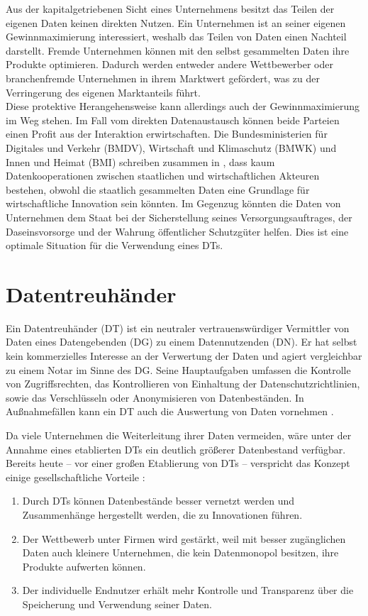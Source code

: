 \documentclass[
	fontsize=11pt,
	headings=small,
	parskip=half,           %
	bibliography=totoc,
	numbers=noenddot,       %
	open=any,               %
]{scrreprt}
\begin{document}
Aus der kapitalgetriebenen Sicht eines Unternehmens besitzt das Teilen der eigenen Daten keinen direkten Nutzen. Ein Unternehmen ist an seiner eigenen Gewinnmaximierung interessiert, weshalb das Teilen von Daten einen Nachteil darstellt. Fremde Unternehmen können mit den selbst gesammelten Daten ihre Produkte optimieren. Dadurch werden entweder andere Wettbewerber oder branchenfremde Unternehmen in ihrem Marktwert gefördert, was zu der Verringerung des eigenen Marktanteils führt. \\
Diese protektive Herangehensweise kann allerdings auch der Gewinnmaximierung im Weg stehen. Im Fall vom direkten Datenaustausch können beide Parteien einen Profit aus der Interaktion erwirtschaften. Die Bundesministerien für Digitales und Verkehr (BMDV), Wirtschaft und Klimaschutz (BMWK) und Innen und Heimat (BMI) schreiben zusammen in \cite{dt-bundesregierung2021datenstrategie}, dass kaum Datenkooperationen zwischen staatlichen und wirtschaftlichen Akteuren bestehen, obwohl die staatlich gesammelten Daten eine Grundlage für wirtschaftliche Innovation sein könnten. Im Gegenzug könnten die Daten von Unternehmen dem Staat bei der Sicherstellung seines Versorgungsauftrages, der Daseinsvorsorge und der Wahrung öffentlicher Schutzgüter helfen. Dies ist eine optimale Situation für die Verwendung eines DTs.
\section{Datentreuhänder}
\label{sec:dt}
Ein Datentreuhänder (DT) ist ein neutraler vertrauenswürdiger Vermittler von Daten eines Datengebenden (DG) zu einem Datennutzenden (DN). Er hat selbst kein kommerzielles Interesse an der Verwertung der Daten und agiert vergleichbar zu einem Notar im Sinne des DG. Seine Hauptaufgaben umfassen die Kontrolle von Zugriffsrechten, das Kontrollieren von Einhaltung der Datenschutzrichtlinien, sowie das Verschlüsseln oder Anonymisieren von Datenbeständen. In Außnahmefällen kann ein DT auch die Auswertung von Daten vornehmen \cite{dt-bundesregierung2021datenstrategie,dt-richter2020ddvtalk}.

Da viele Unternehmen die Weiterleitung ihrer Daten vermeiden, wäre unter der Annahme eines etablierten DTs ein deutlich größerer Datenbestand verfügbar. Bereits heute -- vor einer großen Etablierung von DTs -- verspricht das Konzept  einige gesellschaftliche Vorteile \cite{dt-richter2020ddvtalk}: 
\begin{enumerate}
    \item Durch DTs können Datenbestände besser vernetzt werden und Zusammenhänge hergestellt werden, die zu Innovationen führen.
    \item Der Wettbewerb unter Firmen wird gestärkt, weil mit besser zugänglichen Daten auch kleinere Unternehmen, die kein Datenmonopol besitzen, ihre Produkte aufwerten können.
    \item Der individuelle Endnutzer erhält mehr Kontrolle und Transparenz über die Speicherung und Verwendung seiner Daten.
\end{enumerate}
\end{document}
